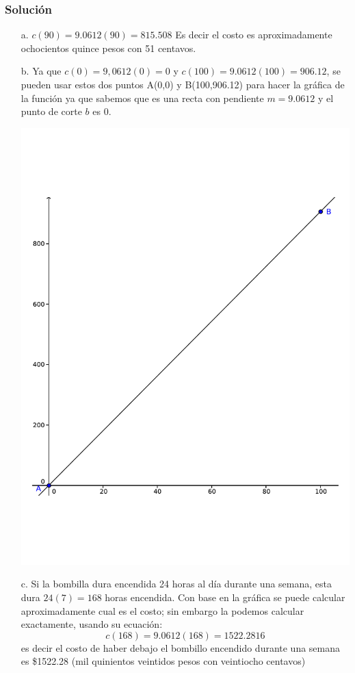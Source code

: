 \documentclass[letterpaper,11pt,twoside]{article}
\begin{document}
\begin{multicols}{2}
 \subsubsection*{Solución}
 \begin{itemize}
\item[a.]  $c(90)=9.0612(90)=815.508$ Es decir el costo es aproximadamente ochocientos quince pesos con 51 centavos.
\item[b.] Ya que $c(0)=9,0612(0)=0$ y $c(100)=9.0612(100)=906.12$, se pueden usar estos dos puntos A(0,0) y B(100,906.12) para hacer la gráfica de la función ya que sabemos que es una recta con pendiente $m=9.0612$ y el punto de corte $b$ es 0.
\begin{center}
\includegraphics[trim=0cm 2.5cm 0cm 3.5cm, scale=.45]{Images/bombilla-graph.pdf} 
\end{center}
\item[c.] Si la bombilla dura encendida 24 horas al día durante una semana, esta dura $24(7)=168$ horas encendida. Con base en la gráfica se puede calcular aproximadamente cual es el costo; sin embargo la podemos calcular exactamente, usando su ecuación:
\[c(168)=9.0612(168)=1522.2816\]
es decir el costo de haber debajo el bombillo encendido durante una semana es \$1522.28 (mil quinientos veintidos pesos con veintiocho centavos)
 \end{itemize}

\end{multicols}
\end{document}
